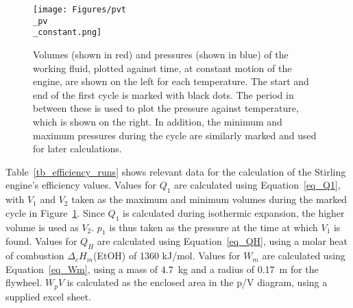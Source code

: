 \documentclass[titlepage]{article}
\begin{document}
\begin{figure}[H]
    \centering
    \texttt{[image: Figures/pvt\\\_pv\\\_constant.png]}
    \caption{Volumes (shown in red) and pressures (shown in blue) of the working fluid, plotted against time, at constant motion of the engine, are shown on the left for each temperature. The start and end of the first cycle is marked with black dots. The period in between these is used to plot the pressure against temperature, which is shown on the right. In addition, the minimum and maximum pressures during the cycle are similarly marked and used for later calculations.}
    \label{fig_constant_pvt_pv}
\end{figure}

\noindent Table~\ref{tb_efficiency_runs} shows relevant data for the calculation of the Stirling engine's efficiency values. Values for \(Q_1\) are calculated using Equation~\ref{eq_Q1}, with \(V_1\) and \(V_2\) taken as the maximum and minimum volumes during the marked cycle in Figure~\ref{fig_constant_pvt_pv}. Since \(Q_1\) is calculated during isothermic expansion, the higher volume is used as \(V_2\). \(p_1\) is thus taken as the pressure at the time at which \(V_1\) is found. Values for \(Q_H\) are calculated using Equation~\ref{eq_QH}, using a molar heat of combustion \(\Delta_c H_m\)(EtOH) of 1360 kJ/mol. Values for \(W_m\) are calculated using Equation~\ref{eq_Wm}, using a mass of 4.7~kg and a radius of 0.17~m for the flywheel. \(W_pV\) is calculated as the enclosed area in the p/V diagram, using a supplied excel sheet.
\end{document}
